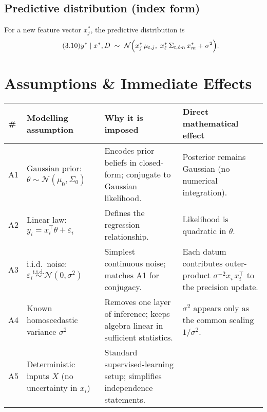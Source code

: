 \documentclass[11pt]{article}
\begin{document}
\subsection{Predictive distribution (index form)}

For a new feature vector $x^*_j$, the predictive distribution is
\begin{equation}\tag{3.10}
y^* \mid x^*, D
\;\sim\;
\mathcal{N}\Bigl(
x^*_j\,\mu_{t,j},
\;x^*_\ell\,\Sigma_{t,\ell m}\,x^*_m + \sigma^2
\Bigr).
\end{equation}

\section{Assumptions \& Immediate Effects}

\begin{table}[ht]
  \small
  \centering
  \begin{tabularx}{\textwidth}{l X X X}
    \toprule
    \#   & Modelling assumption                                    & Why it is imposed                                                   & Direct mathematical effect                                                              \\
    \midrule
    A1   & Gaussian prior: \(\theta\sim\mathcal{N}(\mu_0,\Sigma_0)\)  
         & Encodes prior beliefs in closed-form; conjugate to Gaussian likelihood. 
         & Posterior remains Gaussian (no numerical integration).                                   \\
    A2   & Linear law: \(y_i = x_i^\top\theta + \varepsilon_i\)      
         & Defines the regression relationship.                                  
         & Likelihood is quadratic in \(\theta\).                                                     \\
    A3   & i.i.d.\ noise: \(\varepsilon_i\overset{\mathrm{i.i.d.}}{\sim}\mathcal{N}(0,\sigma^2)\)  
         & Simplest continuous noise; matches A1 for conjugacy.                  
         & Each datum contributes outer-product \(\sigma^{-2}x_i\,x_i^\top\) to the precision update. \\
    A4   & Known homoscedastic variance \(\sigma^2\)               
         & Removes one layer of inference; keeps algebra linear in sufficient statistics. 
         & \(\sigma^2\) appears only as the common scaling \(1/\sigma^2\).                              \\
    A5   & Deterministic inputs \(X\) (no uncertainty in \(x_i\))  
         & Standard supervised-learning setup; simplifies independence statements. 

\end{tabularx}
\end{table}
\end{document}

